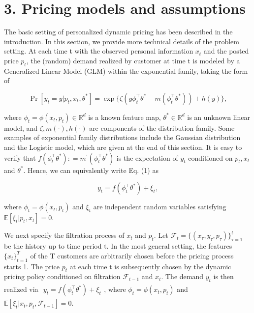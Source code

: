 \section{3. Pricing models and assumptions}\label{pricing-models-and-assumptions}

The basic setting of personalized dynamic pricing has been described in the introduction. In this section, we provide more technical details of the problem setting. At each time t with the observed personal information \(x _ { t }\) and the posted price \(p _ { t }\), the (random) demand realized by customer at time t is modeled by a Generalized Linear Model (GLM) within the exponential family, taking the form of

\[
\operatorname * {P r} [ y _ {t} = y | p _ {t}, x _ {t}, \theta^ {*} ] = \exp \{\zeta (y \phi_ {t} ^ {\top} \theta^ {*} - m (\phi_ {t} ^ {\top} \theta^ {*})) + h (y) \}, \tag {1}
\]

where \(\phi _ { t } = \phi ( x _ { t } , p _ { t } ) \in \mathbb { R } ^ { d }\) is a known feature map, \(\theta ^ { * } \in \mathbb { R } ^ { d }\) is an unknown linear model, and \(\zeta , m ( \cdot ) , h ( \cdot )\) are components of the distribution family. Some examples of exponential family distributions include the Gaussian distribution and the Logistic model, which are given at the end of this section. It is easy to verify that \(f ( \phi _ { t } ^ { \top } \theta ^ { * } ) : = m ^ { \prime } ( \phi _ { t } ^ { \top } \theta ^ { * } )\) is the expectation of \(y _ { t }\) conditioned on \(p _ { t } , x _ { t }\) and \(\theta ^ { * }\). Hence, we can equivalently write Eq. (1) as

\[
y _ {t} = f \left(\phi_ {t} ^ {\top} \theta^ {*}\right) + \xi_ {t}, \tag {2}
\]

where \(\phi _ { t } = \phi ( x _ { t } , p _ { t } )\) and \(\xi _ { t }\) are independent random variables satisfying \(\mathbb { E } [ \xi _ { t } | p _ { t } , x _ { t } ] = 0\).

We next specify the filtration process of \(x _ { t }\) and \(p _ { t }\). Let \(\mathcal { F } _ { t } = \{ ( x _ { \tau } , y _ { \tau } , p _ { \tau } ) \} _ { \tau = 1 } ^ { t }\) be the history up to time period t. In the most general setting, the features \(\{ x _ { t } \} _ { t = 1 } ^ { T }\) of the T customers are arbitrarily chosen before the pricing process starts 1. The price \(p _ { t }\) at each time t is subsequently chosen by the dynamic pricing policy conditioned on filtration \(\mathcal { F } _ { t - 1 }\) and \(x _ { t }\). The demand \(y _ { t }\) is then realized via \(\begin{array} { r } { y _ { t } = f ( \phi _ { t } ^ { \top } \theta ^ { * } ) + \xi _ { t } } \end{array}\), where \(\phi _ { t } = \phi ( x _ { t } , p _ { t } )\) and \(\mathbb { E } [ \xi _ { t } | x _ { t } , p _ { t } , \mathcal { F } _ { t - 1 } ] = 0\).

